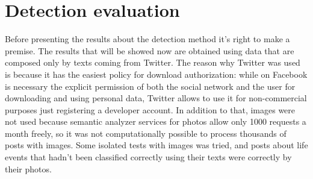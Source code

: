\section{Detection evaluation}
\label{sec:detectioneva}
\noindent
\renewcommand\arraystretch{1.5}
\setlength\tabcolsep{0pt}
\begin{table}
\centering
{}
\quad
{}
\caption{Confusion matrices of boolean tests}
\end{table}
Before presenting the results about the detection method it's right to make a premise. The results that will be showed now are obtained using data that are composed only by texts coming from Twitter. The reason why Twitter was used is because it has the easiest policy for download authorization: while on Facebook is necessary the explicit permission of both the social network and the user for downloading and using personal data, Twitter allows to use it for non-commercial purposes just registering a developer account. In addition to that, images were not used because semantic analyzer services for photos allow only 1000 requests a month freely, so it was not computationally possible to process thousands of posts with images. Some isolated tests with images was tried, and posts about life events that hadn't been classified correctly using their texts were correctly by their photos.

